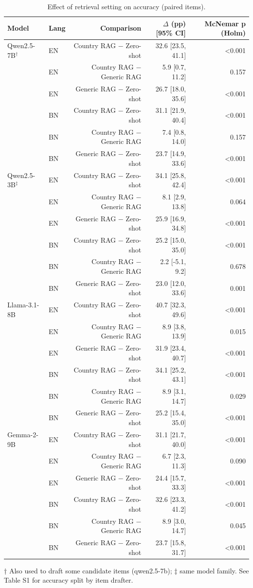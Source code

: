 \begin{table}[t]
\centering
\footnotesize
\caption{Effect of retrieval setting on accuracy (paired items).}
\label{tab:settings}
\begin{tabular}{llrrr}
\toprule
Model & Lang & Comparison & $\Delta$ (pp) [95\% CI] & McNemar p (Holm) \\
\midrule
Qwen2.5-7B$^\dagger$ & EN & Country RAG $-$ Zero-shot & 32.6 [23.5, 41.1] & <0.001 \\
 & EN & Country RAG $-$ Generic RAG & 5.9 [0.7, 11.2] & 0.157 \\
 & EN & Generic RAG $-$ Zero-shot & 26.7 [18.0, 35.6] & <0.001 \\
 & BN & Country RAG $-$ Zero-shot & 31.1 [21.9, 40.4] & <0.001 \\
 & BN & Country RAG $-$ Generic RAG & 7.4 [0.8, 14.0] & 0.157 \\
 & BN & Generic RAG $-$ Zero-shot & 23.7 [14.9, 33.6] & <0.001 \\
\addlinespace
Qwen2.5-3B$^\ddagger$ & EN & Country RAG $-$ Zero-shot & 34.1 [25.8, 42.4] & <0.001 \\
 & EN & Country RAG $-$ Generic RAG & 8.1 [2.9, 13.8] & 0.064 \\
 & EN & Generic RAG $-$ Zero-shot & 25.9 [16.9, 34.8] & <0.001 \\
 & BN & Country RAG $-$ Zero-shot & 25.2 [15.0, 35.0] & <0.001 \\
 & BN & Country RAG $-$ Generic RAG & 2.2 [-5.1, 9.2] & 0.678 \\
 & BN & Generic RAG $-$ Zero-shot & 23.0 [12.0, 33.6] & 0.001 \\
\addlinespace
Llama-3.1-8B & EN & Country RAG $-$ Zero-shot & 40.7 [32.3, 49.6] & <0.001 \\
 & EN & Country RAG $-$ Generic RAG & 8.9 [3.8, 13.9] & 0.015 \\
 & EN & Generic RAG $-$ Zero-shot & 31.9 [23.4, 40.7] & <0.001 \\
 & BN & Country RAG $-$ Zero-shot & 34.1 [25.2, 43.1] & <0.001 \\
 & BN & Country RAG $-$ Generic RAG & 8.9 [3.1, 14.7] & 0.029 \\
 & BN & Generic RAG $-$ Zero-shot & 25.2 [15.4, 35.0] & <0.001 \\
\addlinespace
Gemma-2-9B & EN & Country RAG $-$ Zero-shot & 31.1 [21.7, 40.0] & <0.001 \\
 & EN & Country RAG $-$ Generic RAG & 6.7 [2.3, 11.3] & 0.090 \\
 & EN & Generic RAG $-$ Zero-shot & 24.4 [15.7, 33.3] & <0.001 \\
 & BN & Country RAG $-$ Zero-shot & 32.6 [23.3, 41.2] & <0.001 \\
 & BN & Country RAG $-$ Generic RAG & 8.9 [3.0, 14.7] & 0.045 \\
 & BN & Generic RAG $-$ Zero-shot & 23.7 [15.8, 31.7] & <0.001 \\
\bottomrule
\end{tabular}
\par\smallskip\parbox{\linewidth}{\scriptsize † Also used to draft some candidate items (qwen2.5-7b); ‡ same model family. See Table S1 for accuracy split by item drafter.}
\end{table}


